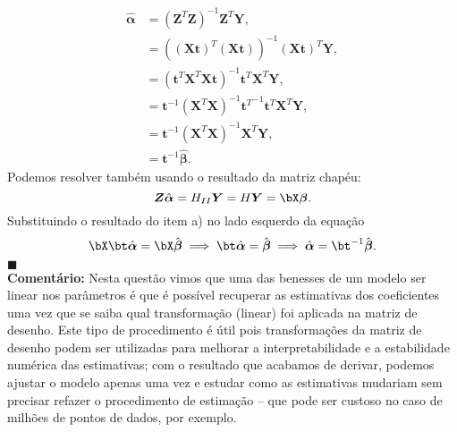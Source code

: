 {\begin{align*}
    \hat{\boldsymbol{\alpha}} &= \left( \boldsymbol{Z}^T\boldsymbol{Z}\right)^{-1}\boldsymbol{Z}^T \boldsymbol{Y}, \\
    &= \left( (\boldsymbol{Xt})^T(\boldsymbol{Xt}) \right)^{-1}(\boldsymbol{Xt})^T \boldsymbol{Y}, \\
    &= \left( \boldsymbol{t}^T\boldsymbol{X}^T\boldsymbol{X} \boldsymbol{t}\right)^{-1}\boldsymbol{t}^T\boldsymbol{X}^T \boldsymbol{Y}, \\
    &= \boldsymbol{t}^{-1}\left( \boldsymbol{X}^T\boldsymbol{X} \right)^{-1}{\boldsymbol{t}^T}^{-1}\boldsymbol{t}^T\boldsymbol{X}^T \boldsymbol{Y}, \\
    &= \boldsymbol{t}^{-1}\left( \boldsymbol{X}^T\boldsymbol{X} \right)^{-1}\boldsymbol{X}^T \boldsymbol{Y}, \\
    &= \boldsymbol{t}^{-1} \hat{\boldsymbol{\beta}}.
\end{align*}
Podemos resolver também usando o resultado da matriz chapéu:
\begin{equation*}
    \boldsymbol{Z} \hat{\boldsymbol{\alpha}} = H_{II} \boldsymbol{Y} = H \boldsymbol{Y} = \bX \boldsymbol{\beta}.
\end{equation*}
Substituindo o resultado do item a) no lado esquerdo da equação
\begin{equation*}
    \bX \bt \hat{\boldsymbol{\alpha}} = \bX \hat{\boldsymbol{\beta}} \implies \bt \hat{\boldsymbol{\alpha}} = \hat{\boldsymbol{\beta}} \implies \hat{\boldsymbol{\alpha}} = \bt^{-1} \hat{\boldsymbol{\beta}}.
\end{equation*}
$\blacksquare$\\
\textbf{Comentário:} Nesta questão vimos que uma das benesses de um modelo ser linear nos parâmetros é que é possível recuperar as estimativas dos coeficientes uma vez que se saiba qual transformação (linear) foi aplicada na matriz de desenho.
Este tipo de procedimento é útil pois transformações da matriz de desenho podem ser utilizadas para melhorar a interpretabilidade e a estabilidade numérica das estimativas; com o resultado que acabamos de derivar, podemos ajustar o modelo apenas uma vez e estudar como as estimativas mudariam sem precisar refazer o procedimento de estimação -- que pode ser custoso no caso de milhões de pontos de dados, por exemplo.
}